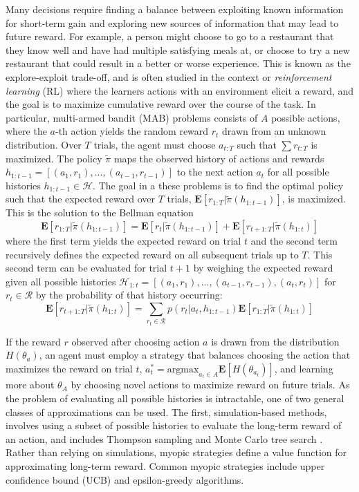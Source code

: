 \documentclass[10pt,letterpaper]{article}
\begin{document}
	Many decisions require finding a balance between exploiting known information for short-term gain and exploring new sources of information that may lead to future reward. For example, a person might choose to go to a restaurant that they know well and have had multiple satisfying meals at, or choose to try a new restaurant that could result in a better or worse experience. This is known as the explore-exploit trade-off, and is often studied in the context or \textit{reinforcement learning} (RL) \citep{Sutton1998a} where the learners actions with an environment elicit a reward, and the goal is to maximize cumulative reward over the course of the task. In particular, multi-armed bandit (MAB) problems consists of $A$ possible actions, where the $a$-th action yields the random reward $r_{t}$ drawn from an unknown distribution. Over $T$ trials, the agent must choose $a_{t:T}$ such that $\sum r_{t:T}$ is maximized. The policy $\tilde{\pi}$ maps the observed history of actions and rewards $h_{1:t-1} = [(a_{1}, r_{1}),...,(a_{t-1}, r_{t-1})]$ to the next action $a_{t}$ for all possible histories $h_{1:t-1} \in \mathcal{H}$. The goal in a these problems is to find the optimal policy such that the expected reward over $T$ trials, $\mathbf{E}[r_{1:T} | \tilde{\pi}( h_{1:t-1})]$, is maximized. This is the solution to the Bellman equation
	\begin{equation}
	\mathbf{E}[r_{1:T} | \tilde{\pi}( h_{1:t-1})] = \mathbf{E}[r_{t} | \tilde{\pi}(h_{1:t-1})] + \mathbf{E}[r_{t+1:T} | \tilde{\pi}( h_{1:t})]
	\end{equation}
	where the first term yields the expected reward on trial $t$ and the second term recursively defines the expected reward on all subsequent trials up to $T$. This second term can be evaluated for trial $t+1$ by weighing the expected reward given all possible histories $ \mathcal{ H}_{1:t} = [(a_{1}, r_{1}),...,(a_{t-1},r_{t-1}),(a_{t},r_{t})]$ for $r_{t} \in \mathcal{R}$ by the probability of that history occurring:
	\begin{equation}
	\mathbf{E}[r_{t+1:T} | \tilde{\pi}( h_{1:t})] = \sum_{r_{t} \in \mathcal{R}} p(r_{t} | a_{t}, h_{1:t-1}) \mathbf{E}[r_{1:T} | \tilde{\pi}( h_{1:t})]
	\end{equation}

	If the reward $r$ observed after choosing action $a$ is drawn from the distribution $H(\theta_{a})$, an agent must employ a strategy that balances choosing the action that maximizes the reward on trial $t$, $a_{t}^{*} = \text{argmax}_{a_{t} \in A} \mathbf{E}[H(\theta_{a_{t}})]$, and learning more about $\theta_{A}$ by choosing novel actions to maximize reward on future trials. As the problem of evaluating all possible histories is intractable, one of two general classes of approximations can be used. The first, simulation-based methods, involves using a subset of possible histories to evaluate the long-term reward of an action, and includes Thompson sampling \citep{Thompson} and Monte Carlo tree search \citep{Coulom2007}. Rather than relying on simulations, myopic strategies define a value function for approximating long-term reward. Common myopic strategies include upper confidence bound (UCB) \citep{Agrawal} and epsilon-greedy \citep{Sutton1998a} algorithms.
	
\end{document}
